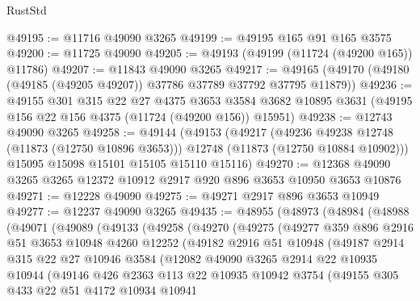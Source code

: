 \begin{lexlean}{RustStd}
\begin{coremodule}
@49195 := @11716 @49090 @3265
@49199 := @49195 @165 @91 @165 @3575
@49200 := @11725 @49090
@49205 := @49193 (@49199 (@11724 (@49200 @165)) @11786)
@49207 := @11843 @49090 @3265
@49217 := @49165 (@49170 (@49180 (@49185 (@49205 @49207)) @37786 @37789 @37792 @37795 @11879))
@49236 := @49155
    @301
    @315
    @22
    @27
    @4375
    @3653
    @3584
    @3682
    @10895
    @3631
    (@49195 @156 @22 @156 @4375 (@11724 (@49200 @156)) @15951)
@49238 := @12743 @49090 @3265
@49258 := @49144
    (@49153
      (@49217
        (@49236 @49238 @12748 (@11873 (@12750 @10896 @3653)))
        @12748
        (@11873 (@12750 @10884 @10902)))
      @15095
      @15098
      @15101
      @15105
      @15110
      @15116)
@49270 := @12368 @49090 @3265 @3265 @12372 @10912 @2917 @920 @896 @3653 @10950 @3653 @10876
@49271 := @12228 @49090
@49275 := @49271 @2917 @896 @3653 @10949
@49277 := @12237 @49090 @3265
@49435 := @48955
    (@48973
      (@48984
        (@48988
          (@49071
            (@49089
              (@49133
                (@49258
                  (@49270
                    (@49275
                      (@49277
                        @359
                        @896
                        @2916
                        @51
                        @3653
                        @10948
                        @4260
                        @12252
                        (@49182
                          @2916
                          @51
                          @10948
                          (@49187
                            @2914
                            @315
                            @22
                            @27
                            @10946
                            @3584
                            (@12082
                              @49090
                              @3265
                              @2914
                              @22
                              @10935
                              @10944
                              (@49146
                                @426
                                @2363
                                @113
                                @22
                                @10935
                                @10942
                                @3754
                                (@49155
                                  @305
                                  @433
                                  @22
                                  @51
                                  @4172
                                  @10934
                                  @10941

\end{coremodule}
\end{lexlean}
